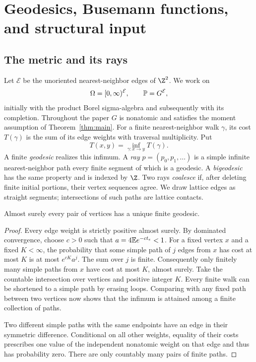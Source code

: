 \section{Geodesics, Busemann functions, and structural input}
\label{sec:preliminaries}

\subsection{The metric and its rays}
Let \(\mathcal E\) be the unoriented nearest-neighbor edges of \(\Z^2\).
We work on
\[
 \Omega=[0,\infty)^{\mathcal E},\qquad \mathbb P=G^{\mathcal E},
\]
initially with the product Borel sigma-algebra and subsequently with its
completion. Throughout the paper \(G\) is nonatomic and satisfies the
moment assumption of Theorem~\ref{thm:main}.
For a finite nearest-neighbor walk \(\gamma\), its cost \(T(\gamma)\)
is the sum of its edge weights with traversal multiplicity. Put
\[
 T(x,y)=\inf_{\gamma:x\longrightarrow y}T(\gamma).
\]
A finite \emph{geodesic} realizes this infimum. A \emph{ray}
\(p=(p_0,p_1,\ldots)\) is a simple infinite nearest-neighbor path every
finite segment of which is a geodesic. A \emph{bigeodesic} has the same
property and is indexed by \(\Z\).
Two rays \emph{coalesce} if, after deleting finite initial portions,
their vertex sequences agree.
We draw lattice edges as straight segments; intersections of such paths
are lattice contacts.

\begin{lemma}\label{lem:finite-minimizers}
Almost surely every pair of vertices has a unique finite geodesic.
\end{lemma}
\begin{proof}
Every edge weight is strictly positive almost surely. By dominated
convergence, choose \(c>0\) such that
\(a=4\mathbb E e^{-ct_e}<1\).
For a fixed vertex \(x\) and a fixed \(K<\infty\), the probability that
some simple path of \(j\) edges from \(x\) has cost at most \(K\) is
at most \(e^{cK}a^j\). The sum over \(j\) is finite.
Consequently only finitely many simple paths from \(x\) have cost at
most \(K\), almost surely. Take the countable intersection over vertices
and positive integer \(K\).
Every finite walk can be shortened to a simple path by erasing loops.
Comparing with any fixed path between two vertices now shows that the
infimum is attained among a finite collection of paths.

Two different simple paths with the same endpoints have an edge in their
symmetric difference. Conditional on all other weights, equality of their
costs prescribes one value of the independent nonatomic weight on that
edge and thus has probability zero. There are only countably many pairs
of finite paths.
\end{proof}

